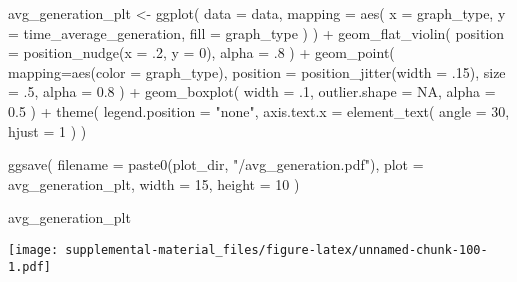 \documentclass[
]{book}
\newenvironment{Shaded}{\begin{snugshade}}{\end{snugshade}}
\newcommand{\AttributeTok}[1]{\textcolor[rgb]{0.77,0.63,0.00}{#1}}
\newcommand{\ConstantTok}[1]{\textcolor[rgb]{0.00,0.00,0.00}{#1}}
\newcommand{\DecValTok}[1]{\textcolor[rgb]{0.00,0.00,0.81}{#1}}
\newcommand{\FloatTok}[1]{\textcolor[rgb]{0.00,0.00,0.81}{#1}}
\newcommand{\FunctionTok}[1]{\textcolor[rgb]{0.00,0.00,0.00}{#1}}
\newcommand{\NormalTok}[1]{#1}
\newcommand{\OtherTok}[1]{\textcolor[rgb]{0.56,0.35,0.01}{#1}}
\newcommand{\SpecialCharTok}[1]{\textcolor[rgb]{0.00,0.00,0.00}{#1}}
\newcommand{\StringTok}[1]{\textcolor[rgb]{0.31,0.60,0.02}{#1}}
\begin{document}
\begin{Shaded}
\begin{Highlighting}[]
\NormalTok{avg\_generation\_plt }\OtherTok{\textless{}{-}} \FunctionTok{ggplot}\NormalTok{(}
    \AttributeTok{data =}\NormalTok{ data,}
    \AttributeTok{mapping =} \FunctionTok{aes}\NormalTok{(}
      \AttributeTok{x =}\NormalTok{ graph\_type,}
      \AttributeTok{y =}\NormalTok{ time\_average\_generation,}
      \AttributeTok{fill =}\NormalTok{ graph\_type}
\NormalTok{    )}
\NormalTok{  ) }\SpecialCharTok{+}
  \FunctionTok{geom\_flat\_violin}\NormalTok{(}
    \AttributeTok{position =} \FunctionTok{position\_nudge}\NormalTok{(}\AttributeTok{x =}\NormalTok{ .}\DecValTok{2}\NormalTok{, }\AttributeTok{y =} \DecValTok{0}\NormalTok{),}
    \AttributeTok{alpha =}\NormalTok{ .}\DecValTok{8}
\NormalTok{  ) }\SpecialCharTok{+}
  \FunctionTok{geom\_point}\NormalTok{(}
    \AttributeTok{mapping=}\FunctionTok{aes}\NormalTok{(}\AttributeTok{color =}\NormalTok{ graph\_type),}
    \AttributeTok{position =} \FunctionTok{position\_jitter}\NormalTok{(}\AttributeTok{width =}\NormalTok{ .}\DecValTok{15}\NormalTok{),}
    \AttributeTok{size =}\NormalTok{ .}\DecValTok{5}\NormalTok{,}
    \AttributeTok{alpha =} \FloatTok{0.8}
\NormalTok{  ) }\SpecialCharTok{+}
  \FunctionTok{geom\_boxplot}\NormalTok{(}
    \AttributeTok{width =}\NormalTok{ .}\DecValTok{1}\NormalTok{,}
    \AttributeTok{outlier.shape =} \ConstantTok{NA}\NormalTok{,}
    \AttributeTok{alpha =} \FloatTok{0.5}
\NormalTok{  ) }\SpecialCharTok{+}
  \FunctionTok{theme}\NormalTok{(}
    \AttributeTok{legend.position =} \StringTok{"none"}\NormalTok{,}
    \AttributeTok{axis.text.x =} \FunctionTok{element\_text}\NormalTok{(}
      \AttributeTok{angle =} \DecValTok{30}\NormalTok{,}
      \AttributeTok{hjust =} \DecValTok{1}
\NormalTok{    )}
\NormalTok{  )}

\FunctionTok{ggsave}\NormalTok{(}
  \AttributeTok{filename =} \FunctionTok{paste0}\NormalTok{(plot\_dir, }\StringTok{"/avg\_generation.pdf"}\NormalTok{),}
  \AttributeTok{plot =}\NormalTok{ avg\_generation\_plt,}
  \AttributeTok{width =} \DecValTok{15}\NormalTok{,}
  \AttributeTok{height =} \DecValTok{10}
\NormalTok{)}

\NormalTok{avg\_generation\_plt}
\end{Highlighting}
\end{Shaded}

\texttt{[image: supplemental-material\_files/figure-latex/unnamed-chunk-100-1.pdf]}
\end{document}
